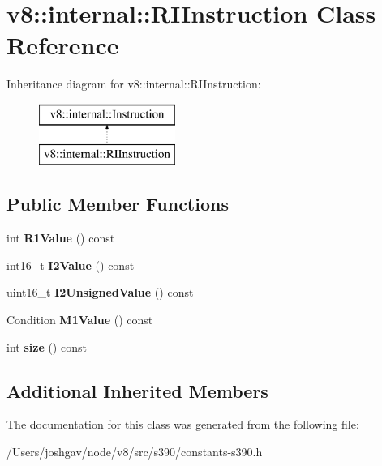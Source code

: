 \hypertarget{classv8_1_1internal_1_1_r_i_instruction}{}\section{v8\+:\+:internal\+:\+:R\+I\+Instruction Class Reference}
\label{classv8_1_1internal_1_1_r_i_instruction}
Inheritance diagram for v8\+:\+:internal\+:\+:R\+I\+Instruction\+:\begin{figure}[H]
\begin{center}
\leavevmode
\includegraphics[height=2.000000cm]{classv8_1_1internal_1_1_r_i_instruction}
\end{center}
\end{figure}
\subsection*{Public Member Functions}
\begin{DoxyCompactItemize}
\item 
int {\bfseries R1\+Value} () const \hypertarget{classv8_1_1internal_1_1_r_i_instruction_a8e6714804193dfb6ebdd270de9e07982}{}\label{classv8_1_1internal_1_1_r_i_instruction_a8e6714804193dfb6ebdd270de9e07982}

\item 
int16\+\_\+t {\bfseries I2\+Value} () const \hypertarget{classv8_1_1internal_1_1_r_i_instruction_a08e192345351acf4e2e203577cd0270b}{}\label{classv8_1_1internal_1_1_r_i_instruction_a08e192345351acf4e2e203577cd0270b}

\item 
uint16\+\_\+t {\bfseries I2\+Unsigned\+Value} () const \hypertarget{classv8_1_1internal_1_1_r_i_instruction_a7c95f52d9f8a7718b1469b2d1d0854a4}{}\label{classv8_1_1internal_1_1_r_i_instruction_a7c95f52d9f8a7718b1469b2d1d0854a4}

\item 
Condition {\bfseries M1\+Value} () const \hypertarget{classv8_1_1internal_1_1_r_i_instruction_ad70fa21ec478871e1fec9cb6e325a8d4}{}\label{classv8_1_1internal_1_1_r_i_instruction_ad70fa21ec478871e1fec9cb6e325a8d4}

\item 
int {\bfseries size} () const \hypertarget{classv8_1_1internal_1_1_r_i_instruction_aca32a0b42755fcbce046db32204dc6e1}{}\label{classv8_1_1internal_1_1_r_i_instruction_aca32a0b42755fcbce046db32204dc6e1}

\end{DoxyCompactItemize}
\subsection*{Additional Inherited Members}


The documentation for this class was generated from the following file\+:\begin{DoxyCompactItemize}
\item 
/\+Users/joshgav/node/v8/src/s390/constants-\/s390.\+h\end{DoxyCompactItemize}
